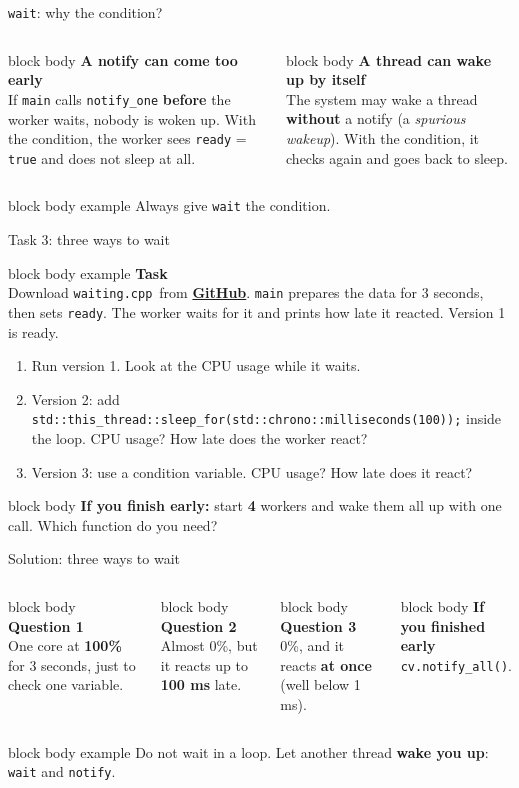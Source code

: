 \documentclass[aspectratio=169,10pt]{beamer}
\newcommand{\stepbox}[2]{%
  \begin{beamercolorbox}[rounded=true,sep=0.09cm,wd=\linewidth]{block body}
    \footnotesize\textbf{#1}\\ #2
  \end{beamercolorbox}\vspace{0.06cm}}
\newcommand{\taskhead}[2]{%
  \begin{beamercolorbox}[rounded=true,sep=0.12cm,wd=\linewidth]{block body example}
    \small\textbf{#1}\\[0.04cm]
    \footnotesize #2
  \end{beamercolorbox}\vspace{0.1cm}}
\newcommand{\keymsg}[1]{%
  \begin{beamercolorbox}[rounded=true,sep=0.1cm,wd=\textwidth]{block body example}
    \centering\footnotesize #1
  \end{beamercolorbox}}
\newcommand{\fileWait}{\texttt{waiting.cpp}}
\newcommand{\ghlink}[1]{\href{https://github.com/KsaweryM/Computer-Hardware-Course/tree/main/Lecture_8_Deadlock_and_Cooperating_Threads/#1}{\textcolor{DeepBlue}{\textbf{GitHub}}}}
\begin{document}
\begin{frame}{\texttt{wait}: why the condition?}
  \vfill
  \begin{columns}[T,onlytextwidth]
      \stepbox{A notify can come too early}{If \texttt{main} calls \texttt{notify\_one} \textbf{before} the worker
        waits, nobody is woken up. With the condition, the worker sees \texttt{ready} = \texttt{true} and does not
        sleep at all.}
      \stepbox{A thread can wake up by itself}{The system may wake a thread \textbf{without} a notify
        (a \emph{spurious wakeup}). With the condition, it checks again and goes back to sleep.}
  \end{columns}
  \vfill
  \keymsg{Always give \texttt{wait} the condition.}
\end{frame}

\begin{frame}{Task 3: three ways to wait}
  \taskhead{Task}{Download \fileWait\ from \ghlink{Task3}. \texttt{main} prepares the data for 3 seconds, then sets \texttt{ready}.
    The worker waits for it and prints how late it reacted. Version 1 is ready.}
  \footnotesize
  \begin{enumerate}\setlength{\itemsep}{5pt}
    \item Run version 1. Look at the CPU usage while it waits.
    \item Version 2: add \texttt{std::this\_thread::sleep\_for(std::chrono::milliseconds(100));} inside the loop.
      CPU usage? How late does the worker react?
    \item Version 3: use a condition variable. CPU usage? How late does it react?
  \end{enumerate}
  \vfill
  \begin{beamercolorbox}[rounded=true,sep=0.1cm,wd=\linewidth]{block body}
    \scriptsize\textbf{If you finish early:} start \textbf{4} workers and wake them all up with one call.
    Which function do you need?
  \end{beamercolorbox}
\end{frame}

\begin{frame}{Solution: three ways to wait}
  \begin{columns}[T,onlytextwidth]
      \stepbox{Question 1}{One core at \textbf{100\%} for 3 seconds, just to check one variable.}
      \stepbox{Question 2}{Almost 0\%, but it reacts up to \textbf{100 ms} late.}
      \stepbox{Question 3}{0\%, and it reacts \textbf{at once} (well below 1 ms).}
      \stepbox{If you finished early}{\texttt{cv.notify\_all()}.}
  \end{columns}
  \vfill
  \keymsg{Do not wait in a loop. Let another thread \textbf{wake you up}: \texttt{wait} and \texttt{notify}.}
\end{frame}
\end{document}
